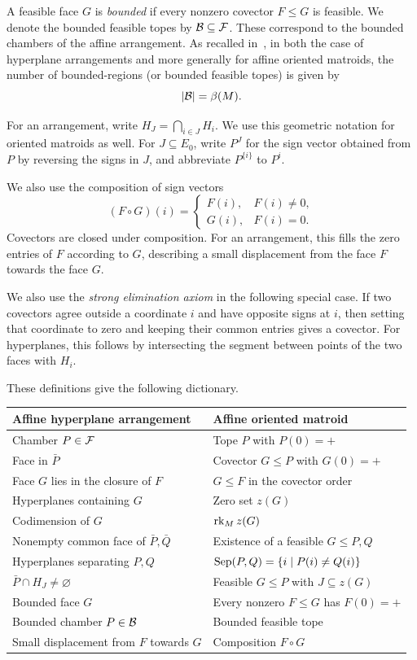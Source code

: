 A feasible face $G$ is \emph{bounded} if
every nonzero covector $F\leq G$ is feasible. We denote the bounded
feasible topes by $\mathcal B\subseteq\mathcal F$. These correspond to the bounded
chambers of the affine arrangement.  As recalled in~\cite[Proposition 3.5]{Lam}, in both the case of hyperplane arrangements and more generally for affine oriented matroids, the number of bounded-regions (or bounded feasible topes) is given by
\[
 |\mathcal B|=\beta(M).
\]


For an arrangement, write $H_J=\bigcap_{i\in J}H_i$.
We use this geometric notation for oriented matroids as well. 
 For $J\subseteq E_0$, write
$P^J$ for the sign vector obtained from $P$ by reversing the signs in
$J$, and abbreviate $P^{\{i\}}$ to $P^i$.

We also use the composition of sign vectors
\[
 (F\circ G)(i)=
 \begin{cases}F(i),&F(i)\ne0,\\G(i),&F(i)=0.\end{cases}
\]
Covectors are closed under composition. For an arrangement, this fills
the zero entries of $F$ according to $G$, describing a small displacement
from the face $F$ towards the face $G$.

We also use the \emph{strong elimination axiom} in the following
special case. If two covectors agree outside a coordinate $i$ and
have opposite signs at $i$, then setting that coordinate to zero
and keeping their common entries gives a covector.
For hyperplanes, this follows by intersecting the segment between
points of the two faces with $H_i$.

These definitions give the following dictionary.

\begin{center}
\small
\begin{tabularx}{\textwidth}{@{}XX@{}}
\toprule
Affine hyperplane arrangement & Affine oriented matroid\\
\midrule
Chamber $P\in\mathcal F$ & Tope $P$ with $P(0)=+$\\
Face in $\bar P$ & Covector $G\leq P$ with $G(0)=+$\\
Face $G$ lies in the closure of $F$ & $G\leq F$ in the covector order\\
Hyperplanes containing $G$ & Zero set $z(G)$\\
Codimension of $G$ & $\operatorname{rk}_M z(G)$\\
Nonempty common face of $\bar P,\bar Q$ & Existence of a feasible $G\leq P,Q$\\
Hyperplanes separating $P,Q$ & $\operatorname{Sep}(P,Q)=\{i\mid P(i)\ne Q(i)\}$\\
$\bar P\cap H_J\ne\varnothing$ & Feasible $G\leq P$ with $J\subseteq z(G)$\\
Bounded face $G$ & Every nonzero $F\leq G$ has $F(0)=+$\\
Bounded chamber $P\in\mathcal B$ & Bounded feasible tope\\
Small displacement from $F$ towards $G$ & Composition $F\circ G$\\
\bottomrule
\end{tabularx}
\end{center}

